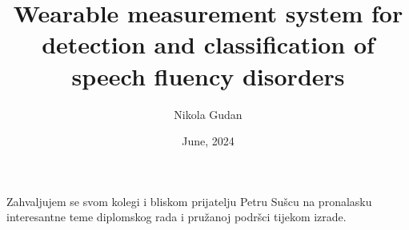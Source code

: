 \documentclass[diplomskirad]{fer}
\title{Wearable measurement system for detection and classification of speech fluency disorders}
\author{Nikola Gudan}
\date{June, 2024}
\begin{document}
\maketitle






\begin{zahvale}
  Zahvaljujem se svom kolegi i bliskom prijatelju Petru Sušcu na pronalasku interesantne teme diplomskog rada i pružanoj podršci tijekom izrade.
\end{zahvale}


\mainmatter


\tableofcontents


%


















\end{document}
